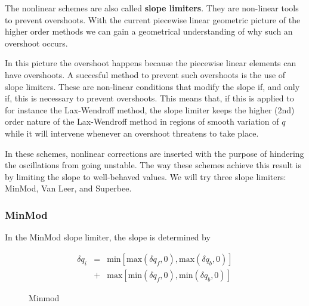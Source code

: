 The nonlinear schemes are also called {\bf slope limiters}. They are
non-linear tools to prevent overshoots. With the current piecewise linear geometric picture of the higher
order methods we can gain a geometrical understanding of why such an overshoot occurs. 

In this picture the overshoot happens because the piecewise linear elements can have overshoots. A succesful method to prevent such overshoots is the use of slope limiters. These are
non-linear conditions that modify the slope if, and only if, this is necessary to prevent overshoots. This means that, if this is applied to for instance the Lax-Wendroff method, the slope
limiter keeps the higher (2nd) order nature of the Lax-Wendroff method in regions of smooth variation
of $q$ while it will intervene whenever an overshoot threatens to take place.

In these
schemes, nonlinear corrections are inserted with the purpose of
hindering the oscillations from going unstable. The way these schemes
achieve this result is by limiting the slope to well-behaved
values. We will try three slope limiters: MinMod, Van Leer, and
Superbee.

\subsubsection{MinMod}

In the MinMod slope limiter, the slope is determined by 

\begin{eqnarray}
\delta q_i &=& \mathrm{min}[\mathrm{max} (\delta q_f,0),\mathrm{max}(\delta q_b,0)] \\
&+& \mathrm{max}[\mathrm{min} (\delta q_f,0),\mathrm{min}(\delta q_b,0)]
\end{eqnarray}

\begin{figure}
  \begin{center}
  \end{center}
  \caption[]{Minmod}
  \label{fig:minmod}
\end{figure}

